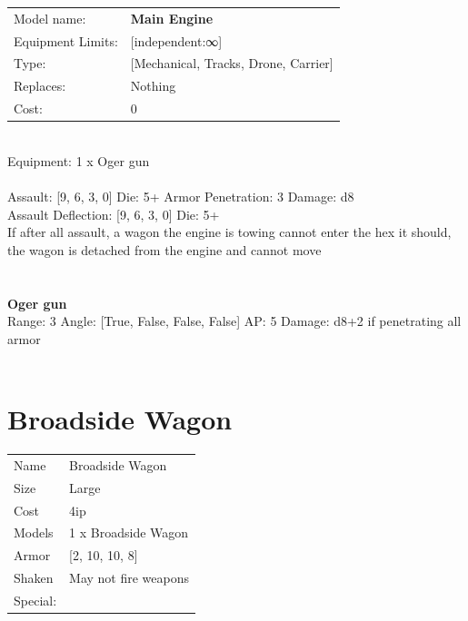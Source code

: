 \noindent
\begin{tabular}{ll}
Model name: &{\bf Main Engine } \\
Equipment Limits: &[independent:∞] \\
Type: &[Mechanical, Tracks, Drone, Carrier] \\
Replaces: &Nothing \\
Cost: & 0\\
\end{tabular}
\ \\
Equipment: 1 x Oger gun \\
\ \\
Assault: [9, 6, 3, 0] Die: 5+ Armor Penetration: 3 Damage: d8 \\
Assault Deflection: [9, 6, 3, 0] Die: 5+\\
\indent If after all assault, a wagon the engine is towing cannot enter the hex it should, the wagon is detached from the engine and cannot move\\ 
 
\ \\

\ \\
{\bf Oger gun } \\



Range: 3  Angle: [True, False, False, False] AP: 5 Damage: d8+2 if penetrating all armor \\




 
\ \\













\clearpage

\section{ Broadside Wagon }

\begin{tabular}{ll}
  Name & Broadside Wagon \\
  Size & Large\\
  Cost & 4ip\\
  Models & 1 x Broadside Wagon\\
  Armor & [2, 10, 10, 8]\\
  Shaken & May not fire weapons\\
  Special: \\
\end{tabular}

